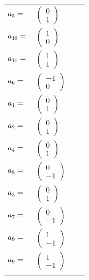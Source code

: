 \documentclass[1p]{elsarticle_modified}
\theoremstyle{definition}
\begin{document}
\begin{tabular}{m{7pt} m{180pt} m{7pt} m{180pt} }
\flushright $a_{5}=$&$\begin{pmatrix}0\\1\end{pmatrix}$ \\
\flushright $a_{10}=$&$\begin{pmatrix}1\\0\end{pmatrix}$ \\
\flushright $a_{11}=$&$\begin{pmatrix}1\\1\end{pmatrix}$ \\
\flushright $a_{6}=$&$\begin{pmatrix}-1\\0\end{pmatrix}$ \\
\flushright $a_{1}=$&$\begin{pmatrix}0\\1\end{pmatrix}$ \\
\flushright $a_{2}=$&$\begin{pmatrix}0\\1\end{pmatrix}$ \\
\flushright $a_{4}=$&$\begin{pmatrix}0\\1\end{pmatrix}$ \\
\flushright $a_{8}=$&$\begin{pmatrix}0\\-1\end{pmatrix}$ \\
\flushright $a_{3}=$&$\begin{pmatrix}0\\1\end{pmatrix}$ \\
\flushright $a_{7}=$&$\begin{pmatrix}0\\-1\end{pmatrix}$ \\
\flushright $a_{9}=$&$\begin{pmatrix}1\\-1\end{pmatrix}$\\ \flushright $a_{9}=$&$\begin{pmatrix}1\\-1\end{pmatrix}$\\&\end{tabular}
\end{document}
